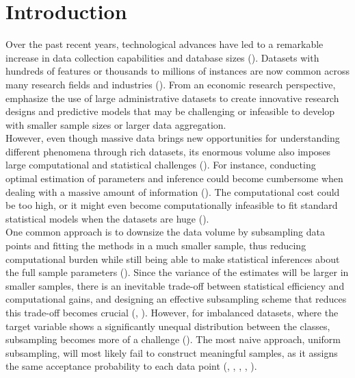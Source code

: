 

\section{Introduction}
\label{sec:introduction}

Over the past recent years, technological advances have led to a remarkable increase in data collection capabilities and database sizes (\cite{wang2019information}). Datasets with hundreds of features or thousands to millions of instances are now common across many research fields and industries (\cite{li2013statistical}). From an economic research perspective, \textcite{einav2014data} emphasize the use of large administrative datasets to create innovative research designs and predictive models that may be challenging or infeasible to develop with smaller sample sizes or larger data aggregation. \\

However, even though massive data brings new opportunities for understanding different phenomena through rich datasets, its enormous volume also imposes large computational and statistical challenges (\cite{fan2014challenges}). For instance, conducting optimal estimation of parameters and inference could become cumbersome when dealing with a massive amount of information (\cite{ng2017opportunities}). The computational cost could be too high, or it might even become computationally infeasible to fit standard statistical models when the datasets are huge (\cite{han2020local}). \\

One common approach is to downsize the data volume by subsampling data points and fitting the methods in a much smaller sample, thus reducing computational burden while still being able to make statistical inferences about the full sample parameters (\cite{yu2023}). Since the variance of the estimates will be larger in smaller samples, there is an inevitable trade-off between statistical efficiency and computational gains, and designing an effective subsampling scheme that reduces this trade-off becomes crucial (\cite{lee2020economics}, \cite{han2020local}). However, for imbalanced datasets, where the target variable shows a significantly unequal distribution between the classes, subsampling becomes more of a challenge  (\cite{he2019}). The most naive approach, uniform subsampling, will most likely fail to construct meaningful samples, as it assigns the same acceptance probability to each data point (\cite{hastie2014}, \cite{han2020local}, \cite{wang2020rare}, \cite{yao2021review}, \cite{cheng2020}).\\

